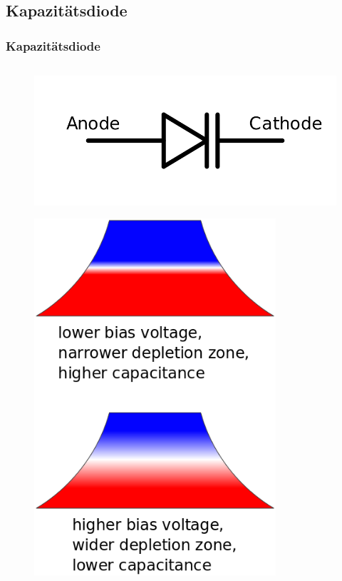 \subsection*{Kapazitätsdiode}
\begin{frame}
  \frametitle{Kapazitätsdiode}
  \begin{columns}[c]
    \begin{center}
      \begin{figure}
        \includegraphics[width=1\textwidth,height=.15\textheight,keepaspectratio]{a05/Varicap_symbol.png}
      \end{figure}
      \begin{figure}
        \includegraphics[width=0.8\textwidth,height=.4\textheight,keepaspectratio]{a05/Varactor_function.png}

\end{figure}
\end{center}
\end{columns}
\end{frame}
